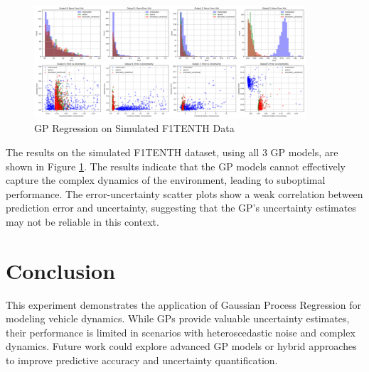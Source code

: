 \documentclass[12pt]{article}
\begin{document}
\begin{figure}[h]
    \centering
    \includegraphics[width=0.9\textwidth]{figs/all_outputs_norm_hist_and_scatter_compare.png}
    \caption{GP Regression on Simulated F1TENTH Data}
    \label{fig:gp_simulated}
\end{figure}

The results on the simulated F1TENTH dataset, using all 3 GP models, are shown in Figure \ref{fig:gp_simulated}. The results indicate that the GP models cannot effectively capture the complex dynamics of the environment, leading to suboptimal performance. The error-uncertainty scatter plots show a weak correlation between prediction error and uncertainty, suggesting that the GP's uncertainty estimates may not be reliable in this context.

\section{Conclusion}
This experiment demonstrates the application of Gaussian Process Regression for modeling vehicle dynamics. While GPs provide valuable uncertainty estimates, their performance is limited in scenarios with heteroscedastic noise and complex dynamics. Future work could explore advanced GP models or hybrid approaches to improve predictive accuracy and uncertainty quantification.
\end{document}

